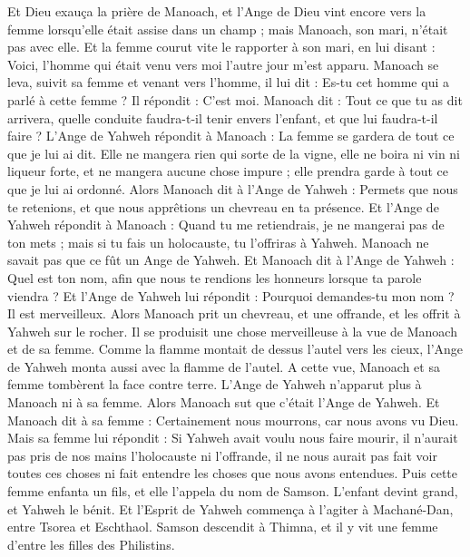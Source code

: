 \begin{multicols}{2}
Et Dieu exauça la prière de Manoach, et l'Ange de Dieu vint encore vers la femme lorsqu'elle était assise dans un champ ; mais Manoach, son mari, n'était pas avec elle.
Et la femme courut vite le rapporter à son mari, en lui disant : Voici, l'homme qui était venu vers moi l'autre jour m'est apparu.
Manoach se leva, suivit sa femme et venant vers l'homme, il lui dit : Es-tu cet homme qui a parlé à cette femme ? Il répondit : C'est moi.
Manoach dit : Tout ce que tu as dit arrivera, quelle conduite faudra-t-il tenir envers l'enfant, et que lui faudra-t-il faire ?
L'Ange de Yahweh répondit à Manoach : La femme se gardera de tout ce que je lui ai dit.
Elle ne mangera rien qui sorte de la vigne, elle ne boira ni vin ni liqueur forte, et ne mangera aucune chose impure ; elle prendra garde à tout ce que je lui ai ordonné.
Alors Manoach dit à l'Ange de Yahweh : Permets que nous te retenions, et que nous apprêtions un chevreau en ta présence.
Et l'Ange de Yahweh répondit à Manoach : Quand tu me retiendrais, je ne mangerai pas de ton mets ; mais si tu fais un holocauste, tu l'offriras à Yahweh. Manoach ne savait pas que ce fût un Ange de Yahweh.
Et Manoach dit à l'Ange de Yahweh : Quel est ton nom, afin que nous te rendions les honneurs lorsque ta parole viendra ?
Et l'Ange de Yahweh lui répondit : Pourquoi demandes-tu mon nom ? Il est merveilleux.
Alors Manoach prit un chevreau, et une offrande, et les offrit à Yahweh sur le rocher. Il se produisit une chose merveilleuse à la vue de Manoach et de sa femme.
Comme la flamme montait de dessus l'autel vers les cieux, l'Ange de Yahweh monta aussi avec la flamme de l'autel. A cette vue, Manoach et sa femme tombèrent la face contre terre.
L'Ange de Yahweh n'apparut plus à Manoach ni à sa femme. Alors Manoach sut que c'était l'Ange de Yahweh.
Et Manoach dit à sa femme : Certainement nous mourrons, car nous avons vu Dieu.
Mais sa femme lui répondit : Si Yahweh avait voulu nous faire mourir, il n'aurait pas pris de nos mains l'holocauste ni l'offrande, il ne nous aurait pas fait voir toutes ces choses ni fait entendre les choses que nous avons entendues.
Puis cette femme enfanta un fils, et elle l'appela du nom de Samson. L'enfant devint grand, et Yahweh le bénit.
Et l'Esprit de Yahweh commença à l'agiter à Machané-Dan, entre Tsorea et Eschthaol.
\VerseOne{}Samson descendit à Thimna, et il y vit une femme d'entre les filles des Philistins.

\end{multicols}
